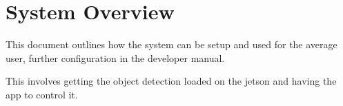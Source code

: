\chapter{System Overview}

This document outlines how the system can be setup and used for the average user, further configuration in the developer manual.

This involves getting the object detection loaded on the jetson and having the app to control it.
